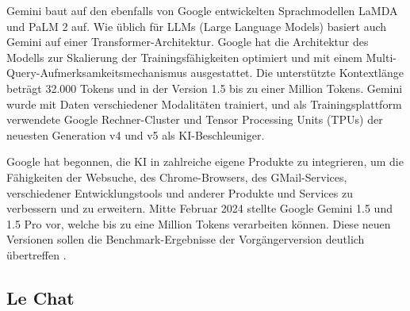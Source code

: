 Gemini baut auf den ebenfalls von Google entwickelten Sprachmodellen LaMDA und PaLM 2 auf. Wie üblich für 
LLMs (Large Language Models) basiert auch Gemini auf einer Transformer-Architektur. Google hat die Architektur des 
Modells zur Skalierung der Trainingsfähigkeiten optimiert und mit einem Multi-Query-Aufmerksamkeitsmechanismus ausgestattet. 
Die unterstützte Kontextlänge beträgt 32.000 Tokens und in der Version 1.5 bis zu einer Million Tokens. Gemini wurde mit 
Daten verschiedener Modalitäten trainiert, und als Trainingsplattform verwendete Google Rechner-Cluster und Tensor 
Processing Units (TPUs) der neuesten Generation v4 und v5 als KI-Beschleuniger.

Google hat begonnen, die KI in zahlreiche eigene Produkte zu integrieren, um die Fähigkeiten der Websuche, des 
Chrome-Browsers, des GMail-Services, verschiedener Entwicklungstools und anderer Produkte und Services zu verbessern 
und zu erweitern. Mitte Februar 2024 stellte Google Gemini 1.5 und 1.5 Pro vor, welche bis zu eine Million Tokens 
verarbeiten können. Diese neuen Versionen sollen die Benchmark-Ergebnisse der Vorgängerversion deutlich übertreffen \cite{GrundlagenGemini}.

\subsection{Le Chat}  \label{Le Chat}

